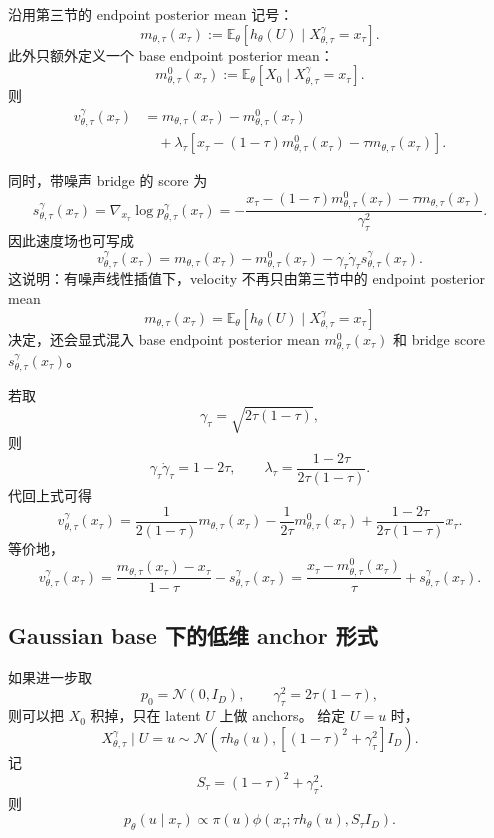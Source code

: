\documentclass[UTF8,11pt]{ctexart}
\newcommand{\E}{\mathbb{E}}
\newcommand{\cN}{\mathcal{N}}
\begin{document}
沿用第三节的 endpoint posterior mean 记号：
\[
m_{\theta,\tau}(x_\tau)
:=
\E_\theta[h_\theta(U)\mid X_{\theta,\tau}^{\gamma}=x_\tau].
\]
此外只额外定义一个 base endpoint posterior mean：
\[
m_{\theta,\tau}^{0}(x_\tau)
:=
\E_\theta[X_0\mid X_{\theta,\tau}^{\gamma}=x_\tau].
\]
则
\begin{align}
v_{\theta,\tau}^{\gamma}(x_\tau)
&=
m_{\theta,\tau}(x_\tau)-m_{\theta,\tau}^{0}(x_\tau)\nonumber\\
&\quad+
\lambda_\tau
\left[
x_\tau-(1-\tau)m_{\theta,\tau}^{0}(x_\tau)-\tau m_{\theta,\tau}(x_\tau)
\right].
\end{align}

同时，带噪声 bridge 的 score 为
\[
s_{\theta,\tau}^{\gamma}(x_\tau)
=
\nabla_{x_\tau}\log p_{\theta,\tau}^{\gamma}(x_\tau)
=
-
\frac{
x_\tau-(1-\tau)m_{\theta,\tau}^{0}(x_\tau)-\tau m_{\theta,\tau}(x_\tau)
}{
\gamma_\tau^2
}.
\]
因此速度场也可写成
\[
v_{\theta,\tau}^{\gamma}(x_\tau)
=
m_{\theta,\tau}(x_\tau)-m_{\theta,\tau}^{0}(x_\tau)
-\gamma_\tau\dot\gamma_\tau s_{\theta,\tau}^{\gamma}(x_\tau).
\]
这说明：有噪声线性插值下，velocity 不再只由第三节中的 endpoint posterior mean
\[
m_{\theta,\tau}(x_\tau)=
\E_\theta[h_\theta(U)\mid X_{\theta,\tau}^{\gamma}=x_\tau]
\]
决定，还会显式混入 base endpoint posterior mean \(m_{\theta,\tau}^{0}(x_\tau)\)
和 bridge score \(s_{\theta,\tau}^{\gamma}(x_\tau)\)。

若取
\[
\gamma_\tau=\sqrt{2\tau(1-\tau)},
\]
则
\[
\gamma_\tau\dot\gamma_\tau=1-2\tau,
\qquad
\lambda_\tau
=
\frac{1-2\tau}{2\tau(1-\tau)}.
\]
代回上式可得
\[
v_{\theta,\tau}^{\gamma}(x_\tau)
=
\frac{1}{2(1-\tau)}m_{\theta,\tau}(x_\tau)
-
\frac{1}{2\tau}m_{\theta,\tau}^{0}(x_\tau)
+
\frac{1-2\tau}{2\tau(1-\tau)}x_\tau.
\]
等价地，
\[
v_{\theta,\tau}^{\gamma}(x_\tau)
=
\frac{m_{\theta,\tau}(x_\tau)-x_\tau}{1-\tau}
-s_{\theta,\tau}^{\gamma}(x_\tau)
=
\frac{x_\tau-m_{\theta,\tau}^{0}(x_\tau)}{\tau}
+s_{\theta,\tau}^{\gamma}(x_\tau).
\]

\subsection{Gaussian base 下的低维 anchor 形式}

如果进一步取
\[
p_0=\cN(0,I_D),
\qquad
\gamma_\tau^2=2\tau(1-\tau),
\]
则可以把 \(X_0\) 积掉，只在 latent \(U\) 上做 anchors。
给定 \(U=u\) 时，
\[
X_{\theta,\tau}^{\gamma}\mid U=u
\sim
\cN
\left(
\tau h_\theta(u),
\left[(1-\tau)^2+\gamma_\tau^2\right]I_D
\right).
\]
记
\[
S_\tau=(1-\tau)^2+\gamma_\tau^2.
\]
则
\[
p_\theta(u\mid x_\tau)
\propto
\pi(u)
\phi
\left(
x_\tau;\tau h_\theta(u),S_\tau I_D
\right).
\]
\end{document}
